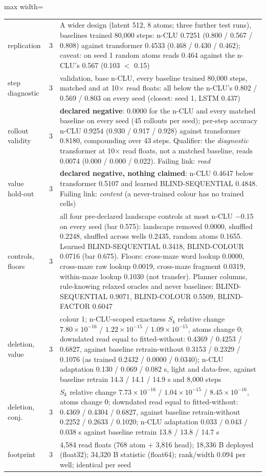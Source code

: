 \documentclass{article} %
\newcommand{\sci}[2]{\ensuremath{#1\times10^{#2}}}
\begin{document}
\begin{table}[h]
\begin{adjustbox}{max width=\linewidth}
\begin{tabular}{p{1.9cm}p{1.2cm}p{10.0cm}}
\quad replication & 3 & A wider design (latent 512, 8 atoms; three further test runs), baselines trained 80,000 steps: n-CLU 0.7251 (0.800 / 0.567 / 0.808) against transformer 0.4533 (0.468 / 0.430 / 0.462); caveat: on seed 1 random atoms reads 0.464 against the n-CLU's 0.567 (0.103 $<$ 0.15) \\ %
\quad step diagnostic & 3 & validation, base n-CLU, every baseline trained 80,000 steps, matched and at 10$\times$ read floats: all below the n-CLU's 0.802 / 0.569 / 0.803 on every seed (closest: seed 1, LSTM 0.437) \\
rollout validity & 3 & \textbf{declared negative}: 0.0000 for the n-CLU and every matched baseline on every seed (45 rollouts per seed); per-step accuracy n-CLU 0.9254 (0.930 / 0.917 / 0.928) against transformer 0.8180, compounding over 43 steps. Qualifier: the \emph{diagnostic} transformer at 10$\times$ read floats, not a matched baseline, reads 0.0074 (0.000 / 0.000 / 0.022). Failing link: \emph{read} \\
value hold-out & 3 & \textbf{declared negative, nothing claimed}: n-CLU 0.4647 below transformer 0.5107 and learned BLIND-SEQUENTIAL 0.4848. Failing link: \emph{content} (a never-trained colour has no trained cells) \\
controls, floors & 3 & all four pre-declared landscape controls at most n-CLU $-$0.15 on every seed (bar 0.575): landscape removed 0.0000, shuffled 0.2248, shuffled across wells 0.2435, random atoms 0.1655. Learned BLIND-SEQUENTIAL 0.3418, BLIND-COLOUR 0.0716 (bar 0.675). Floors: cross-maze word lookup 0.0000, cross-maze raw lookup 0.0019, cross-maze fragment 0.0319, within-maze lookup 0.1030 (not transfer). Planner columns, rule-knowing relaxed oracles and never baselines: BLIND-SEQUENTIAL 0.9071, BLIND-COLOUR 0.5509, BLIND-FACTOR 0.6047 \\
deletion, value & 3 & colour 1; n-CLU-scoped exactness $S_k$ relative change \sci{7.80}{-16} / \sci{1.22}{-15} / \sci{1.09}{-15}, atoms change 0; downdated read equal to fitted-without: 0.4369 / 0.4253 / 0.6827, against baseline retrain-without 0.3153 / 0.2329 / 0.1076 (as trained 0.2432 / 0.0000 / 0.0340); n-CLU adaptation 0.130 / 0.069 / 0.082 s, light and data-free, against baseline retrain 14.3 / 14.1 / 14.9 s and 8,000 steps \\
deletion, conj. & 3 & $S_k$ relative change \sci{7.73}{-16} / \sci{1.04}{-15} / \sci{8.45}{-16}, atoms change 0; downdated read equal to fitted-without: 0.4369 / 0.4304 / 0.6827, against baseline retrain-without 0.2252 / 0.2633 / 0.1020; n-CLU adaptation 0.033 / 0.043 / 0.038 s against baseline retrain 13.8 / 13.8 / 14.7 s \\
footprint & 3 & 4,584 read floats (768 atom + 3,816 head); 18,336 B deployed (float32); 34,320 B statistic (float64); rank/width 0.094 per well; identical per seed \\
\bottomrule
\end{tabular}\end{adjustbox}
\end{table}
\end{document}
